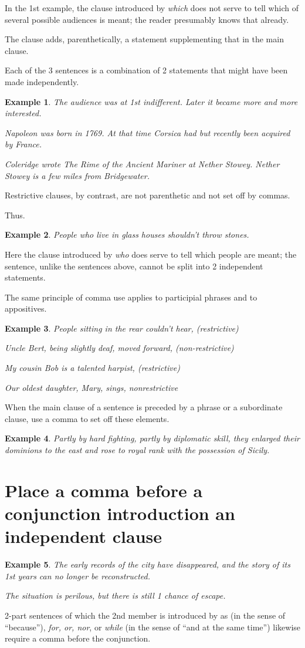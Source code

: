\documentclass{book}
\numberwithin{equation}{section}
\newtheorem{example}{Example}[chapter]
\begin{document}
In the 1st example, the clause introduced by \textit{which} does not serve to tell which of several possible audiences is meant; the reader presumably knows that already.

The clause adds, parenthetically, a statement supplementing that in the main clause.

Each of the 3 sentences is a combination of 2 statements that might have been made independently.
\begin{example}
    The audience was at 1st indifferent. Later it became more and more interested.
    
    Napoleon was born in 1769. At that time Corsica had but recently been acquired by France.
    
    Coleridge wrote The Rime of the Ancient Mariner at Nether Stowey. Nether Stowey is a few miles from Bridgewater.
\end{example}
Restrictive clauses, by contrast, are not parenthetic and not set off by commas.

Thus.
\begin{example}
    People who live in glass houses shouldn't throw stones.
\end{example}
Here the clause introduced by \textit{who} does serve to tell which people are meant; the sentence, unlike the sentences above, cannot be split into 2 independent statements.

The same principle of comma use applies to participial phrases and to appositives.
\begin{example}
    People sitting in the rear couldn't hear, \emph{(restrictive)}
    
    Uncle Bert, being slightly deaf, moved forward, \emph{(non-restrictive)}
    
    My cousin Bob is a talented harpist, \emph{(restrictive)}
    
    Our oldest daughter, Mary, sings, \emph{nonrestrictive}
\end{example}
When the main clause of a sentence is preceded by a phrase or a subordinate clause, use a comma to set off these elements.
\begin{example}
    Partly by hard fighting, partly by diplomatic skill, they enlarged their dominions to the east and rose to royal rank with the possession of Sicily.
\end{example}

\section{Place a comma before a conjunction introduction an independent clause}
\begin{example}
    The early records of the city have disappeared, and the story of its 1st years can no longer be reconstructed.
    
    The situation is perilous, but there is still 1 chance of escape.
\end{example}
2-part sentences of which the 2nd member is introduced by as (in the sense of ``because''), \textit{for, or, nor}, or \textit{while} (in the sense of ``and at the same time'') likewise require a comma before the conjunction.
\end{document}
